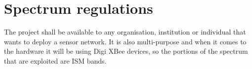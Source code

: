 \section{Spectrum regulations}
The project shall be available to any organisation, institution or individual that wants to deploy a sensor network. It is also multi-purpose and when it comes to the hardware it will be using Digi XBee\textregistered{} devices, so the portions of the spectrum that are exploited are ISM bands.%


